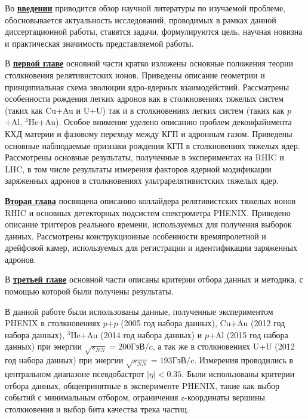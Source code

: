 Во \underline{\textbf{введении}} приводится обзор научной литературы по изучаемой проблеме, обосновывается актуальность исследований, проводимых в рамках данной диссертационной работы, ставятся задачи, формулируются цель, научная новизна и практическая значимость представляемой работы.

В \underline{\textbf{первой главе}} основной части кратко изложены основные положения теории столкновения релятивистских ионов.  Приведены описание геометрии и принципиальная схема эволюции ядро-ядерных взаимодействий. Рассматрены особенности рождения легких адронов как в столкновениях тяжелых систем (таких как Cu+Au и U+U) так и в столкновениях легких систем (таких как $p$+Al, $^{3}$He+Au). Особое внимение уделено описанию проблем деконфайнмента КХД материи и фазовому переходу между КГП и адронным газом. Приведены основные наблюдаемые признаки рождения КГП в столкновениях тяжелых ядер. Рассмотрены основные результаты, полученные в экспериментах на RHIC и LHC, в том числе результаты измерения факторов ядерной модификации заряженных адронов в столкновениях ультрарелятивистских тяжелых ядер.

\underline{\textbf{Вторая глава}} посвящена описанию коллайдера релятивистских тяжелых ионов RHIC и основных детекторных подсистем спектрометра PHENIX. Приведено описание триггеров реального времени, используемых для получения выборок данных. Рассмотрены конструкционные особенности времяпролетной и дрейфовой камер, используемых для регистрации и идентификации заряженных адронов.

В \underline{\textbf{третьей главе}} основной части описаны критерии отбора данных и методика, с помощью которой были получены результаты.

В данной работе были использованы данные, полученные экспериментом PHENIX в столкновениях $p$+$p$ (2005 год набора данных), Cu+Au (2012 год набора данных), $^{3}$He+Au (2014 год набора данных) и $p$+Al (2015 год набора данных) при энергии $\sqrt{s_{NN}}=200$ГэВ/$c$, а так же в столкновениях U+U (2012 год набора данных) при энергии $\sqrt{s_{NN}}=193$ГэВ/$c$. Измерения проводились в центральном диапазоне псевдобастрот $|\eta|<0.35$.
Были использованы критерии отбора данных, общепринятные в эксперименте PHENIX, такие как выбор событий с минимальным отбором, ограничения z-координаты вершины столкновения и выбор бита качества трека частиц. 

